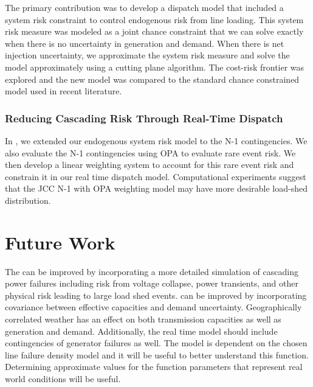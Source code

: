 The primary contribution was to develop a dispatch model that included a system risk constraint to control endogenous risk from line loading.  This system risk measure was modeled as a joint chance constraint that we can solve  exactly when there is no uncertainty in generation and demand.  When there is net injection uncertainty, we approximate the system risk measure and solve the model approximately using a cutting plane algorithm.  The cost-risk frontier was explored and the new model was compared to the standard chance constrained model used in recent literature.  

\subsubsection{Reducing Cascading Risk Through Real-Time Dispatch}
In , we extended our endogenous system risk model to the N-1 contingencies.  We also evaluate the N-1 contingencies using OPA to evaluate rare event risk.  We then develop a linear weighting system to account for this rare event risk and constrain it in our real time dispatch model.  Computational experiments suggest that the JCC N-1 with OPA weighting model may have more desirable load-shed distribution.


\section{Future Work}
The  can be improved by incorporating a more detailed simulation of cascading power failures including risk from voltage collapse, power transients, and other physical risk leading to large load shed events.   can be improved by incorporating covariance between effective capacities and demand uncertainty.  Geographically correlated weather has an effect on both transmission capacities as well as generation and demand. Additionally, the real time model should include contingencies of generator failures as well.  The model is dependent on the chosen line failure density model and it will be useful to better understand this function. Determining approximate values for the function parameters that represent real world conditions will be useful.

	
		

\clearpage

